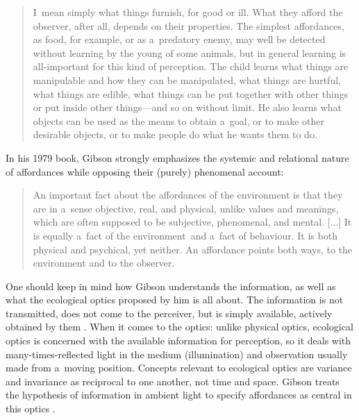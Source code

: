 \documentclass[%
manuscript=article,
year=2024,
volume=77,
doi=00000.000,
]{zfn}
\begin{document}
\begin{quote}
I~mean simply what things furnish, for good or ill. What they afford the observer, after all, depends on their properties. The simplest affordances, as food, for example, or as a~predatory enemy, may well be detected without learning by the young of some animals, but in general learning is all-important for this kind of perception. The child learns what things are manipulable and how they can be manipulated, what things are hurtful, what things are edible, what things can be put together with other things or put inside other things---and so on without limit. He also learns what objects can be used as the means to obtain a~goal, or to make other desirable objects, or to make people do what he wants them to do. 
\parencite[][p.285]{gibson_senses_1966}%
\end{quote}




In his 1979 book, Gibson strongly emphasizes the systemic and relational nature of affordances while opposing their (purely) phenomenal account:



\begin{quote}
An important fact about the affordances of the environment is that they are in a~sense objective, real, and physical, unlike values and meanings, which are often supposed to be subjective, phenomenal, and mental. [...] It is equally a~fact of the environment~and a~fact of behaviour. It is both physical and psychical, yet neither. An affordance points both ways, to the environment and to the observer. 
\parencite[][p.129]{gibson_ecological_1979}%
\end{quote}




One should keep in mind how Gibson understands the information, as well as what the ecological optics proposed by him is all about. The information is not transmitted, does not come to the perceiver, but is simply available, actively obtained by them 
\parencite[][p.307]{gibson_ecological_1979}. %
 When it comes to the optics: unlike physical optics, ecological optics is concerned with the available information for perception, so it deals with many-times-reflected light in the medium (illumination) and observation usually made from a~moving position. Concepts relevant to ecological optics are variance and invariance as reciprocal to one another, not time and space. Gibson treats the hypothesis of information in ambient light to specify affordances as central in this optics 
\parencite[][pp.47–64, 307–309]{gibson_ecological_1979}.%
\end{document}
